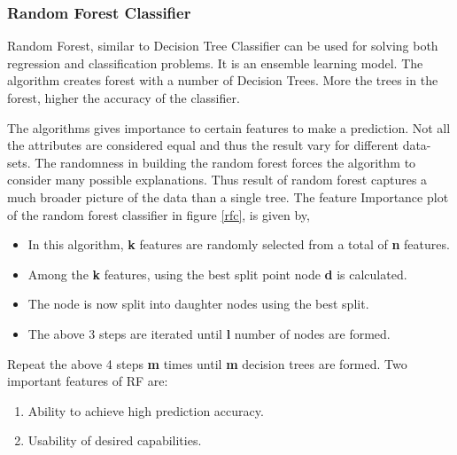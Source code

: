 \documentclass[conference]{IEEEtran}
\begin{document}
\subsubsection*{Random Forest Classifier}
Random Forest, similar to Decision Tree Classifier can be used for solving both regression and classification problems. It is an ensemble learning model. \cite{rf}  The algorithm creates forest with a number of Decision Trees. More the trees in the forest, higher the accuracy of the classifier. 
\par

The algorithms gives importance to certain features to make a prediction. Not all the attributes are considered equal and thus the result vary for different data-sets. The randomness in building the random forest forces the algorithm to consider many possible explanations. Thus result of random forest captures a much broader picture of the data than a single tree. The feature Importance plot of the random forest classifier in figure \ref{rfc}, is given by, 
%
\par
\begin{itemize}
\item In this algorithm, \textbf{k} features are randomly selected from a total of \textbf{n} features.
\item Among the \textbf{k} features, using the best split point node \textbf{d} is calculated.
\item The node is now split into daughter nodes using the best split.
\item The above 3 steps are iterated until \textbf{l} number of nodes are formed.
\end{itemize}
Repeat the above 4 steps \textbf{m} times until \textbf{m} decision trees are formed. Two important features of RF are: 
\begin{enumerate}
\item Ability to achieve high prediction accuracy.
\item Usability of desired capabilities.
\end{enumerate}
\end{document}
